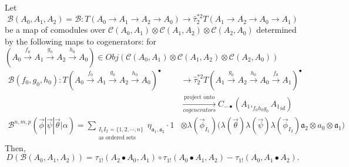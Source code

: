 \begin{prop} \label{prop:c4}
Let 
$$
\mathcal{B}(A_0,A_1,A_2) = \mathcal{B}: 
T(A_0 \to A_1 \to A_2 \to A_0)
\to \hat{\tau}_2^{*2}T(A_1 \to A_2 \to A_0 \to A_1)
$$ 
be a map of comodules over 
$\mathcal{C}(A_0,A_1) \otimes 
\mathcal{C}(A_1,A_2) \otimes 
\mathcal{C}(A_2,A_0)$ 
determined by the following maps to 
cogenerators: for $(A_0 \xrightarrow{f_0}
A_1 \xrightarrow{g_0} A_2
\xrightarrow{h_0} A_0) \in 
Obj(\mathcal{C}(A_0,A_1) \otimes 
\mathcal{C}(A_1,A_2) \otimes 
\mathcal{C}(A_2,A_0))$
\begin{equation}
\label{eq:def_sigma2}
\begin{split}
\mathcal{B}(f_0, g_0,h_0):
  T(A_0 \xrightarrow{f_0}
  A_1 \xrightarrow{g_0} A_2
  \xrightarrow{h_0} A_0)^\bullet
&\to
\hat{\tau}_2^{*2}
  T(A_1 \xrightarrow{g_0} A_2
  \xrightarrow{h_0} A_0 \xrightarrow{f_0} A_1)^\bullet\\
&\xrightarrow[cogenerators]{\textrm{project onto}}
C_{-\bullet}(A_1, _{f_0h_0g_0}{A_1}_{id})\\
\mathcal{B}^{n, m, p} (\vec{\phi} | \vec{\psi} | \vec{\theta} | \alpha) 
= \sum_{\substack{I_1I_2 = \{1,2,\cdots,n\} \\
                          \textrm{as ordered sets}}}
  \eta_{\mathfrak{a}_1,\mathfrak{a}_2}\cdot
  1 &\otimes \lambda(\vec{\phi}_{I_1})\big( \lambda(\vec{\theta}) \lambda(\vec{\psi}) \lambda(\vec{\phi}_{I_2})
  \mathfrak{a}_2 \otimes a_0 \otimes \mathfrak{a}_1 \big)
\end{split}      
\end{equation}
Then, 
\begin{equation} \label{eq:prop4}
D(\mathcal{B}(A_0,A_1,A_2)) = 
  \tau_{1!}(A_2\bullet A_0, A_1) \circ
  \tau_{1!}(A_0\bullet A_1, A_2) 
   - \tau_{1!}(A_0, A_1\bullet A_2).
\end{equation}
\end{prop}

